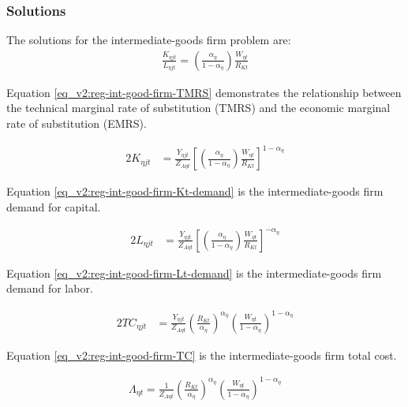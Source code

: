 \documentclass[../thesis.tex]{subfiles}
\begin{document}
\subsubsection*{Solutions}
The solutions for the intermediate-goods firm problem are:
\begin{align}
\frac{K_{\eta jt}}{L_{\eta jt}} = \left( \frac{{\alpha_{\eta}}}{1-\alpha_{\eta}} \right) \frac{W_{\eta t}}{R_{Kt}} \label{eq_v2:reg-int-good-firm-TMRS}
\end{align}

Equation \ref{eq_v2:reg-int-good-firm-TMRS} demonstrates the relationship between the technical marginal rate of substitution (TMRS) and the economic marginal rate of substitution (EMRS). 

\begin{alignat}{2}
	K_{\eta jt} & = \frac{Y_{\eta jt}}{Z_{A\eta t}} \left[ \left( \frac{{\alpha_{\eta}}}{1-\alpha_{\eta}} \right) \frac{W_{\eta t}}{R_{Kt}}\right]^{1-\alpha_{\eta}} \label{eq_v2:reg-int-good-firm-Kt-demand}
\end{alignat}

Equation \ref{eq_v2:reg-int-good-firm-Kt-demand} is the intermediate-goods firm demand for capital. 

\begin{alignat}{2}
	L_{\eta jt} & = \frac{Y_{\eta jt}}{Z_{A\eta t}} \left[ \left( \frac{{\alpha_{\eta}}}{1-\alpha_{\eta}} \right) \frac{W_{\eta t}}{R_{Kt}}\right]^{-{\alpha_{\eta}}} \label{eq_v2:reg-int-good-firm-Lt-demand}
\end{alignat}

Equation \ref{eq_v2:reg-int-good-firm-Lt-demand} is the intermediate-goods firm demand for labor.

\begin{alignat}{2}
	TC_{\eta jt} & = \frac{Y_{\eta jt}}{Z_{A\eta t}} \left( \frac{R_{Kt}}{{\alpha_{\eta}}} \right)^{{\alpha_{\eta}}} \left( \frac{W_{\eta t}}{1-\alpha_{\eta}} \right)^{1-\alpha_{\eta}} \label{eq_v2:reg-int-good-firm-TC}
\end{alignat}

Equation \ref{eq_v2:reg-int-good-firm-TC} is the intermediate-goods firm total cost.

\begin{align}
	\Lambda_{\eta t} = \frac{1}{Z_{A\eta t}} \left( \frac{R_{Kt}}{{\alpha_{\eta}}} \right)^{{\alpha_{\eta}}} \left( \frac{W_{\eta t}}{1-\alpha_{\eta}} \right)^{1-\alpha_{\eta}} \label{eq_v2:reg-int-good-firm-MC-2}
\end{align}
\end{document}
